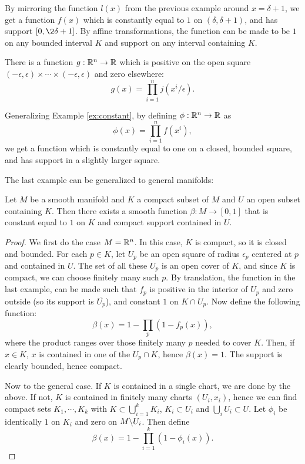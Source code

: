 \documentclass[11pt, english]{article}
\begin{document}
\begin{example}
\label{ex:constant}
  By mirroring the function $l(x)$ from the previous example around $x=\delta+1$, we get a function $f(x)$  which is constantly equal to $1$ on $(\delta,\delta+1)$, and has support $[0,\2\delta + 1]$. By affine transformations, the function can be made to be $1$ on any bounded interval $K$ and support on any interval containing $K$.
\end{example}

\begin{example}
There is a function $g:\mathbb{R}^n \to \mathbb{R}$ which is positive on the open square $(-\epsilon, \epsilon) \times \dotsb \times (-\epsilon, \epsilon)$ and zero elsewhere:
\[
g(x) = \prod_{i=1}^n j(x^i/\epsilon).
\]
\end{example}

\begin{example}
Generalizing Example \ref{ex:constant}, by defining $\phi:\mathbb{R}^n \to \mathbb{R}$ as
\[
\phi(x) = \prod_{i=1}^n f(x^i),
\]
we get a function which is constantly equal to one on a closed, bounded square, and has support in a slightly larger square.
\end{example}

The last example can be generalized to general manifolds:
\begin{prop}
\label{prop:suppfunc}
Let $M$ be a smooth manifold and $K$ a compact subset of $M$ and $U$ an open subset containing $K$. Then there exists a smooth function $\beta:M \to [0,1]$ that is constant equal to $1$ on $K$ and compact support contained in $U$.
\end{prop}
\begin{proof}
We first do the case $M=\mathbb{R}^n$. In this case, $K$ is compact, so it is closed and bounded. For each $p \in K$, let $U_p$ be an open square of radius $\epsilon_p$ centered at $p$ and contained in $U$. The set of all these $U_p$ is an open cover of $K$, and since $K$ is compact, we can choose finitely many such $p$. By translation, the function in the last example, can be made such that $f_p$ is positive in the interior of $U_p$ and zero outside (so its support is $\bar{U_p}$), and constant $1$ on $K \cap U_p$. Now define the following function:
\[
\beta(x) = 1 - \prod_p \left(1-f_p(x)\right),
\]
where the product ranges over those finitely many $p$ needed to cover $K$. Then, if $x \in K$, $x$ is contained in one of the $U_p \cap K$, hence $\beta(x)=1$. The support is clearly bounded, hence compact.

Now to the general case. If $K$ is contained in a single chart, we are done by the above. If not, $K$ is contained in finitely many charts $(U_i,x_i)$, hence we can find compact sets $K_1,\cdots, K_k$ with $K \subset \bigcup_{i=1}^k K_i$, $K_i \subset U_i$ and $\bigcup_i U_i \subset U$. Let $\phi_i$ be identically $1$ on $K_i$ and zero on $M \backslash U_i$. Then define
\[
\beta(x) = 1 - \prod_{i=1}^k (1-\phi_i(x)).
\]
\end{proof}
\end{document}

